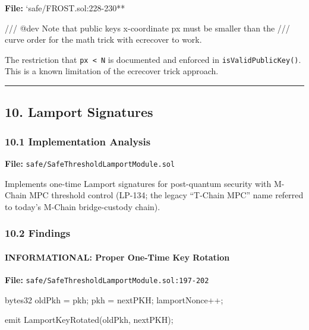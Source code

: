 \documentclass[
]{article}
\newenvironment{Shaded}{}{}
\newcommand{\NormalTok}[1]{#1}
\begin{document}
\textbf{File:} `safe/FROST.sol:228-230**

\begin{Shaded}
\begin{Highlighting}[]
\NormalTok{/// @dev Note that public key\textquotesingle{}s x{-}coordinate \textasciigrave{}px\textasciigrave{} must be smaller than the}
\NormalTok{/// curve order for the math trick with \textasciigrave{}ecrecover\textasciigrave{} to work.}
\end{Highlighting}
\end{Shaded}

The restriction that \texttt{px\ \textless{}\ N} is documented and
enforced in \texttt{isValidPublicKey()}. This is a known limitation of
the ecrecover trick approach.

\begin{center}\rule{0.5\linewidth}{0.5pt}\end{center}

\subsection{10. Lamport Signatures}\label{10-lamport-signatures}

\subsubsection{10.1 Implementation
Analysis}\label{101-implementation-analysis}

\textbf{File:} \texttt{safe/SafeThresholdLamportModule.sol}

Implements one-time Lamport signatures for post-quantum security with
M-Chain MPC threshold control (LP-134; the legacy ``T-Chain MPC'' name
referred to today's M-Chain bridge-custody chain).

\subsubsection{10.2 Findings}\label{102-findings}

\paragraph{INFORMATIONAL: Proper One-Time Key
Rotation}\label{informational-proper-one-time-key-rotation}

\textbf{File:} \texttt{safe/SafeThresholdLamportModule.sol:197-202}

\begin{Shaded}
\begin{Highlighting}[]
\NormalTok{bytes32 oldPkh = pkh;}
\NormalTok{pkh = nextPKH;}
\NormalTok{lamportNonce++;}

\NormalTok{emit LamportKeyRotated(oldPkh, nextPKH);}
\end{Highlighting}
\end{Shaded}
\end{document}
